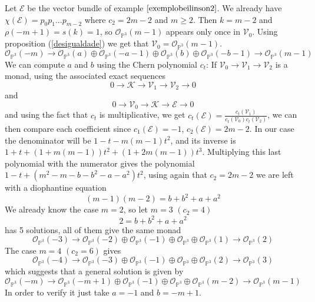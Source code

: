 \documentclass[
	oldfontcommands,
	sumario=abnt-6027-2012,
	12pt,			%
	openright,		%
	oneside,		%
	a4paper,		%
	english,		%
	brazil			%
	]{imecc-unicamp}
\begin{document}
\begin{example}
Let $\mathcal{E}$ be the vector bundle of example $\ref{exemplobeilinson2}$. We already have $\chi(\mathcal{E})=p_0p_1...p_{m-2}$ where $c_2=2m-2$ and $m \geq 2$. Then $k=m-2$ and $\rho(-m+1)=s(k)=1$, so $\mathcal{O}_{\mathbb{P}^3}(m-1)$ appears only once in $\mathcal{V}_0$. Using proposition (\ref{desigualdade}) we get that $\mathcal{V}_0=\mathcal{O}_{\mathbb{P}^3}(m-1)$.
\begin{equation}
\mathcal{O}_{\mathbb{P}^3}(-m) \to \mathcal{O}_{\mathbb{P}^3}(a)\oplus\mathcal{O}_{\mathbb{P}^3}(-a-1)\oplus\mathcal{O}_{\mathbb{P}^3}(b)\oplus\mathcal{O}_{\mathbb{P}^3}(-b-1) \to \mathcal{O}_{\mathbb{P}^3}(m-1)
\end{equation}
We can compute $a$ and $b$ using the Chern polynomial $c_t$:
If $\mathcal{V}_0 \to \mathcal{V}_1 \to \mathcal{V}_2$ is a monad, using the associated exact sequences
\begin{equation}
0 \to \mathcal{K} \to \mathcal{V}_1 \to \mathcal{V}_2 \to 0
\end{equation}
and
\begin{equation}
0 \to \mathcal{V}_0 \to \mathcal{K} \to \mathcal{E} \to 0
\end{equation}
and using the fact that $c_t$ is multiplicative, we get $c_t(\mathcal{E})=\frac{c_t(\mathcal{V}_1)}{c_t(\mathcal{V}_0)c_t(\mathcal{V}_2)}$, we can then compare each coefficient since $c_1(\mathcal{E})=-1$, $c_2(\mathcal{E})=2m-2$. In our case the denominator will be $1-t-m(m-1)t^2$, and its inverse is $1+t+(1+m(m-1))t^2+(1+2m(m-1))t^3$. Multiplying this last polynomial with the numerator gives the polynomial $1-t+(m^2-m-b-b^2-a-a^2)t^2$, using again that $c_2=2m-2$ we are left with a diophantine equation
\begin{equation}\label{diophantine}
(m-1)(m-2)=b+b^2+a+a^2
\end{equation}
We already know the case $m=2$, so let $m=3$ $(c_2=4)$
\begin{equation}
2=b+b^2+a+a^2
\end{equation}
has 5 solutions, all of them give the same monad
\begin{equation}
\mathcal{O}_{\mathbb{P}^3}(-3) \to \mathcal{O}_{\mathbb{P}^3}(-2)\oplus\mathcal{O}_{\mathbb{P}^3}(-1)\oplus\mathcal{O}_{\mathbb{P}^3}\oplus\mathcal{O}_{\mathbb{P}^3}(1) \to \mathcal{O}_{\mathbb{P}^3}(2)
\end{equation}
The case $m=4$ $(c_2=6)$ gives
\begin{equation}
\mathcal{O}_{\mathbb{P}^3}(-4) \to \mathcal{O}_{\mathbb{P}^3}(-3)\oplus\mathcal{O}_{\mathbb{P}^3}(-1)\oplus\mathcal{O}_{\mathbb{P}^3}\oplus\mathcal{O}_{\mathbb{P}^3}(2) \to \mathcal{O}_{\mathbb{P}^3}(3)
\end{equation}
which suggests that a general solution is given by
\begin{equation}
\mathcal{O}_{\mathbb{P}^3}(-m) \to \mathcal{O}_{\mathbb{P}^3}(-m+1)\oplus\mathcal{O}_{\mathbb{P}^3}(-1)\oplus\mathcal{O}_{\mathbb{P}^3}\oplus\mathcal{O}_{\mathbb{P}^3}(m-2) \to \mathcal{O}_{\mathbb{P}^3}(m-1)
\end{equation}
In order to verify it just take $a=-1$ and $b=-m+1$.
\end{example}
\end{document}
